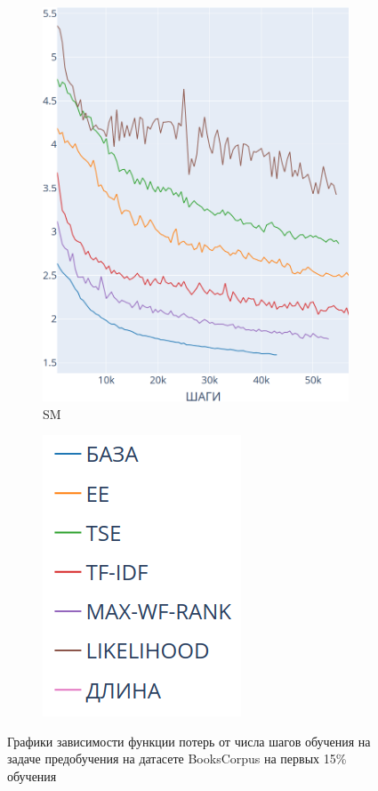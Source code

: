 \documentclass{spbau-diploma}
\begin{document}
\begin{figure}[h]
\begin{subfigure}{.3\textwidth}
		\includegraphics[scale=0.2]{BooksCorpus_SM}
		\caption{SM}
		\label{fig:BooksCorpus_graphs_SM}
	\end{subfigure}
	\begin{subfigure}{.3\textwidth}
		\centering
		\includegraphics[scale=0.5]{BooksCorpus_legend}
		\label{fig:BooksCorpus_graphs_legend}
	\end{subfigure}
	\caption{Графики зависимости функции потерь от числа шагов обучения на задаче предобучения на датасете BooksCorpus на первых 15\% обучения}
	\label{fig:BooksCorpus_graphs}
\end{figure}
\end{document}
